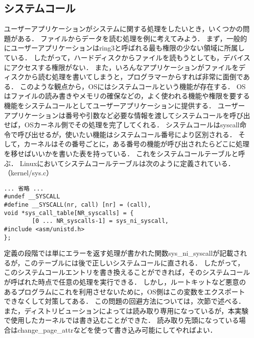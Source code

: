 \documentclass{jsarticle}
\begin{document}
  \subsection{システムコール}
  ユーザーアプリケーションがシステムに関する処理をしたいとき，いくつかの問題がある．
  ファイルからデータを読む処理を例に考えてみよう．
  まず，一般的にユーザーアプリケーションはring3と呼ばれる最も権限の少ない領域に所属している．
  したがって，ハードディスクからファイルを読もうとしても，デバイスにアクセスする権限がない．
  また，いろんなアプリケーションがファイルをディスクから読む処理を書いてしまうと，プログラマーからすれば非常に面倒である．
  このような観点から，OSにはシステムコールという機能が存在する．
  OSはファイルの読み書きやメモリの確保などの，よく使われる機能や権限を要する機能をシステムコールとしてユーザーアプリケーションに提供する．
  ユーザーアプリケーションは番号や引数など必要な情報を渡してシステムコールを呼び出せば，OSカーネル側でその処理を完了してくれる．
  システムコールはsyscall命令で呼び出せるが，使いたい機能はシステムコール番号により区別される．
  そして，カーネルはその番号ごとに，ある番号の機能が呼び出されたらどこに処理を移せばいいかを書いた表を持っている．
  これをシステムコールテーブルと呼ぶ．
  Linuxにおいてシステムコールテーブルは次のように定義されている．（kernel/sys.c）
  \\
  \begin{lstlisting}[basicstyle=\ttfamily\footnotesize, frame=single]
... 省略 ...
#undef __SYSCALL
#define __SYSCALL(nr, call) [nr] = (call),
void *sys_call_table[NR_syscalls] = {
        [0 ... NR_syscalls-1] = sys_ni_syscall,
#include <asm/unistd.h>
};
  \end{lstlisting}
  定義の段階では単にエラーを返す処理が書かれた関数sys\_ni\_syscallが記載されるが，このテーブルには後で正しいシステムコールに直される．
  したがって，このシステムコールエントリを書き換えることができれば，そのシステムコールが呼ばれた時点で任意の処理を実行できる．
  しかし，ルートキットなど悪意のあるプログラムにこれを利用させないために，OS側はこの変数をエクスポートできなくして対策してある．
  この問題の回避方法については，次節で述べる．
  また，ディストリビューションによっては読み取り専用になっているが，本実験で使用したカーネルでは書き込むことができた．
  読み取り先頭になっている場合はchange\_page\_attrなどを使って書き込み可能にしてやればよい．
\end{document}
